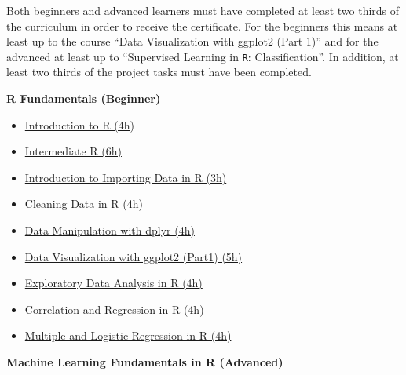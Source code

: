 \documentclass[
  11pt,
]{article}
\providecommand{\tightlist}{%
  \setlength{\itemsep}{0pt}\setlength{\parskip}{0pt}}
\newenvironment{tips}[1]
  {
  \begin{itemize}
  \footnotesize
  \renewcommand{\labelitemi}{
    \raisebox{-.7\height}[0pt][0pt]{
      {\setkeys{Gin}{width=3em,keepaspectratio}
        \texttt{[image: images/\#1.png]}}
    }
  }
  \setlength{\fboxsep}{1em}
  \begin{rbox}
  \item
  }
  {
  \end{rbox}
  \end{itemize}
  }
\begin{document}
Both beginners and advanced learners must have completed at least two thirds of the curriculum in order to receive the certificate. For the beginners this means at least up to the course ``Data Visualization with ggplot2 (Part 1)'' and for the advanced at least up to ``Supervised Learning in \texttt{R}: Classification''. In addition, at least two thirds of the project tasks must have been completed.

\begin{tips}r

\textbf{R Fundamentals (Beginner)}

\begin{itemize}
\tightlist
\item
  \href{https://www.datacamp.com/courses/free-introduction-to-r}{Introduction to R (4h)}
\item
  \href{https://www.datacamp.com/courses/intermediate-r}{Intermediate R (6h)}
\item
  \href{https://www.datacamp.com/courses/importing-data-in-r-part-1}{Introduction to Importing Data in R (3h)}
\item
  \href{https://www.datacamp.com/courses/cleaning-data-in-r}{Cleaning Data in R (4h)}
\item
  \href{https://www.datacamp.com/courses/data-manipulation-with-dplyr-in-r}{Data Manipulation with dplyr (4h)}
\item
  \href{https://www.datacamp.com/courses/data-visualization-with-ggplot2-1}{Data Visualization with ggplot2 (Part1) (5h)}
\item
  \href{https://www.datacamp.com/courses/exploratory-data-analysis}{Exploratory Data Analysis in R (4h)}
\item
  \href{https://www.datacamp.com/courses/correlation-and-regression}{Correlation and Regression in R (4h)}
\item
  \href{https://www.datacamp.com/courses/multiple-and-logistic-regression}{Multiple and Logistic Regression in R (4h)}
\end{itemize}

\textbf{Machine Learning Fundamentals in R (Advanced)}


\end{tips}
\end{document}
